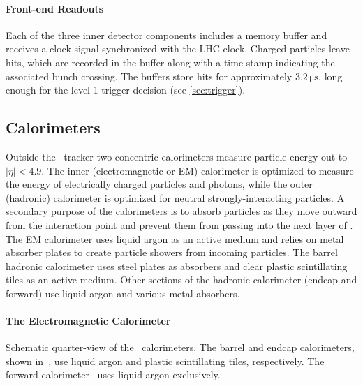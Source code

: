 \paragraph{Front-end Readouts} Each of the three inner detector components includes a memory buffer and receives a clock signal synchronized with the LHC clock.
Charged particles leave hits, which are recorded in the buffer along with a time-stamp indicating the associated bunch crossing.
The buffers store hits for approximately $3.2\,\mathrm{\mu s}$, long enough for the level 1 trigger decision (see \cref{sec:trigger}).



\subsection{Calorimeters}
Outside the \atlas\ tracker two concentric calorimeters measure particle energy out to $|\eta| < 4.9$.
The inner (electromagnetic or EM) calorimeter is optimized to measure the energy of electrically charged particles and photons, while the outer (hadronic) calorimeter is optimized for neutral strongly-interacting particles.
A secondary purpose of the calorimeters is to absorb particles as they move outward from the interaction point and prevent them from passing into the next layer of \atlas.
The EM calorimeter uses liquid argon as an active medium and relies on metal absorber plates to create particle showers from incoming particles.
The barrel hadronic calorimeter uses steel plates as absorbers and clear plastic scintillating tiles as an active medium.
Other sections of the hadronic calorimeter (endcap and forward) use liquid argon and various metal absorbers.

\paragraph{The Electromagnetic Calorimeter}



\begin{cfig}
  \caption[Atlas calorimeter quarter-view]{Schematic quarter-view of the \atlas\ calorimeters. The barrel and endcap calorimeters, shown in~, use liquid argon and plastic scintillating tiles, respectively. The forward calorimeter~ uses liquid argon exclusively.}
  \label{fig:atlas-calos-quarter}
\end{cfig}

